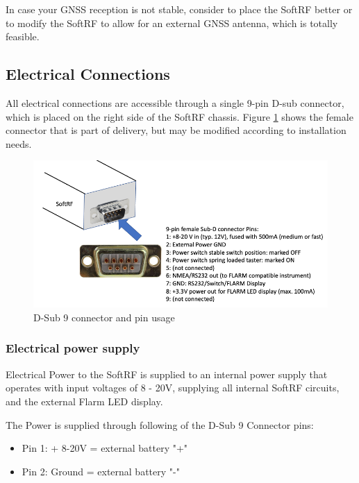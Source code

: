 \documentclass[11pt,a4paper]{article}
\begin{document}
In case your GNSS reception is not stable, consider to place the SoftRF better or to modify the SoftRF to allow for an external GNSS antenna, which is totally feasible.

\FloatBarrier

\subsection{Electrical Connections}
All electrical connections are accessible through a single 9-pin D-sub connector, which is placed on the right side of the SoftRF chassis. Figure \ref{d-sub-9} shows the female connector that is part of delivery, but may be modified according to installation needs.

\begin{figure}[h]
\centering
\includegraphics[scale=.5]{d-sub-9.png}
\caption{D-Sub 9 connector and pin usage}\label{d-sub-9}
\end{figure}\FloatBarrier

\subsubsection{Electrical power supply}
Electrical Power to the SoftRF is supplied to an internal power supply that operates with input voltages of 8 - 20V, supplying all internal SoftRF circuits, and the external Flarm LED display.

The Power is supplied through following of the D-Sub 9 Connector pins:

\begin{itemize}
\item Pin 1: + 8-20V = external battery "+"
\item Pin 2: Ground = external battery "-"
\end{itemize}

\begin{center}\end{center}
\end{document}
